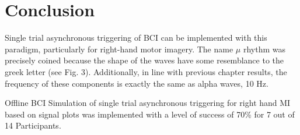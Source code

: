    
\section{Conclusion}

Single trial asynchronous triggering of BCI can be implemented with this paradigm, particularly for right-hand motor imagery. The name $\mu$ rhythm was precisely coined because the shape of the waves have some resemblance to the greek letter (see Fig. 3).  Additionally, in line with previous chapter results, the frequency of these components is exactly the same as alpha waves, 10 Hz.


Offline BCI Simulation of single trial asynchronous triggering for right hand MI based on signal plots was implemented with a level of success of 70\% for 7 out of 14 Participants.